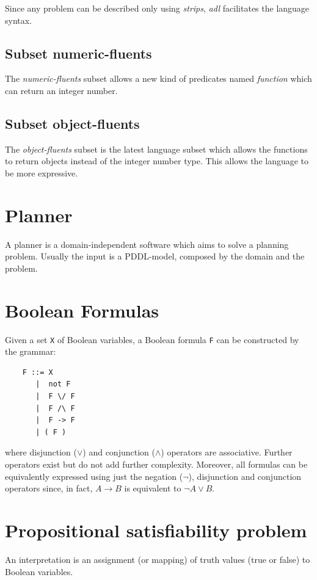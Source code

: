 \documentclass{report}
\theoremstyle{plain}
\begin{document}
Since any problem can be described only using \emph{strips}, \emph{adl} facilitates the language syntax.

\subsection{Subset numeric-fluents}
The \emph{numeric-fluents} subset allows a new kind of predicates named \emph{function} which can return an integer number.

\subsection{Subset object-fluents}
The \emph{object-fluents} subset is the latest language subset which allows the functions to return objects instead of the integer number type. This allows the language to be more expressive.

\section{Planner}
A planner is a domain-independent software which aims to solve a planning problem. Usually the input is a PDDL-model, composed by the domain and the problem.

\section{Boolean Formulas}

Given a set {\tt X} of Boolean variables, a Boolean formula {\tt F} can be constructed by the grammar:
\begin{center}
\begin{verbatim}
    F ::= X
       |  not F
       |  F \/ F
       |  F /\ F
       |  F -> F
       | ( F )
\end{verbatim}
\end{center}
where disjunction ($\vee$) and conjunction ($\wedge$) operators are associative.
Further operators exist but do not add further complexity. Moreover, all formulas can be equivalently expressed using just the negation ($\neg$), disjunction and conjunction  operators since, in fact, $A\to B$ is equivalent to $\neg A \vee B$.

\section{Propositional satisfiability problem}
An interpretation is an assignment (or mapping) of truth values (true or false) to Boolean variables. 
\end{document}
